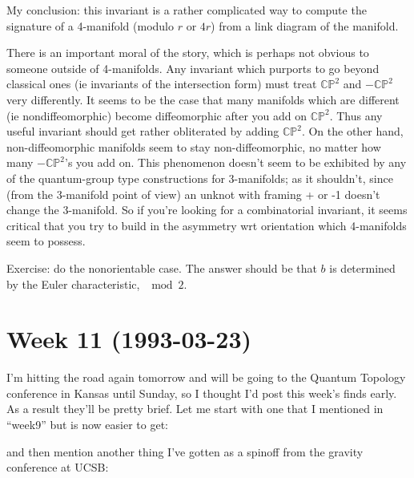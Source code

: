 \documentclass{article}
\def\tightlist{}
\renewcommand{\texttt}[1]{%
  \begingroup
  \ttfamily
  \begingroup\lccode`~=`/\lowercase{\endgroup\def~}{/\discretionary{}{}{}}%
  \begingroup\lccode`~=`[\lowercase{\endgroup\def~}{[\discretionary{}{}{}}%
  \begingroup\lccode`~=`.\lowercase{\endgroup\def~}{.\discretionary{}{}{}}%
  \catcode`/=\active\catcode`[=\active\catcode`.=\active
  \scantokens{#1\noexpand}%
  \endgroup
}
\begin{document}
My conclusion: this invariant is a rather complicated way to compute the
signature of a 4-manifold (modulo \(r\) or \(4r\)) from a link diagram
of the manifold.

There is an important moral of the story, which is perhaps not obvious
to someone outside of 4-manifolds. Any invariant which purports to go
beyond classical ones (ie invariants of the intersection form) must
treat \(\mathbb{CP}^2\) and \(-\mathbb{CP}^2\) very differently. It
seems to be the case that many manifolds which are different (ie
nondiffeomorphic) become diffeomorphic after you add on
\(\mathbb{CP}^2\). Thus any useful invariant should get rather
obliterated by adding \(\mathbb{CP}^2\). On the other hand,
non-diffeomorphic manifolds seem to stay non-diffeomorphic, no matter
how many \(-\mathbb{CP}^2\)'s you add on. This phenomenon doesn't seem
to be exhibited by any of the quantum-group type constructions for
3-manifolds; as it shouldn't, since (from the 3-manifold point of view)
an unknot with framing + or -1 doesn't change the 3-manifold. So if
you're looking for a combinatorial invariant, it seems critical that you
try to build in the asymmetry wrt orientation which 4-manifolds seem to
possess.

Exercise: do the nonorientable case. The answer should be that \(b\) is
determined by the Euler characteristic, \(\mod 2\).
\hypertarget{week-11-1993-03-23}{%
\section{Week 11 (1993-03-23)}\label{week-11-1993-03-23}}

I'm hitting the road again tomorrow and will be going to the Quantum
Topology conference in Kansas until Sunday, so I thought I'd post this
week's finds early. As a result they'll be pretty brief. Let me start
with one that I mentioned in ``week9'' but is now easier to get:


and then mention another thing I've gotten as a spinoff from the gravity
conference at UCSB:
\end{document}
